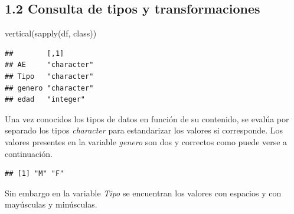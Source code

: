 \documentclass[
]{article}
\newenvironment{Shaded}{\begin{snugshade}}{\end{snugshade}}
\newcommand{\FunctionTok}[1]{\textcolor[rgb]{0.00,0.00,0.00}{#1}}
\newcommand{\NormalTok}[1]{#1}
\newcommand{\SpecialCharTok}[1]{\textcolor[rgb]{0.00,0.00,0.00}{#1}}
\begin{document}
\hypertarget{consulta-de-tipos-y-transformaciones}{%
\subsection{1.2 Consulta de tipos y
transformaciones}\label{consulta-de-tipos-y-transformaciones}}

\begin{Shaded}
\begin{Highlighting}[]
\FunctionTok{vertical}\NormalTok{(}\FunctionTok{sapply}\NormalTok{(df, class))}
\end{Highlighting}
\end{Shaded}

\begin{verbatim}
##        [,1]       
## AE     "character"
## Tipo   "character"
## genero "character"
## edad   "integer"
\end{verbatim}

\vspace{0.3cm}

Una vez conocidos los tipos de datos en función de su contenido, se
evalúa por separado los tipos \emph{character} para estandarizar los
valores si corresponde. Los valores presentes en la variable
\emph{genero} son dos y correctos como puede verse a continuación.

\vspace{0.3cm}

\begin{Shaded}
\end{Shaded}

\begin{verbatim}
## [1] "M" "F"
\end{verbatim}

\vspace{0.3cm}

Sin embargo en la variable \emph{Tipo} se encuentran los valores con
espacios y con mayúsculas y minúsculas.

\vspace{0.3cm}

\begin{Shaded}
\end{Shaded}
\end{document}
